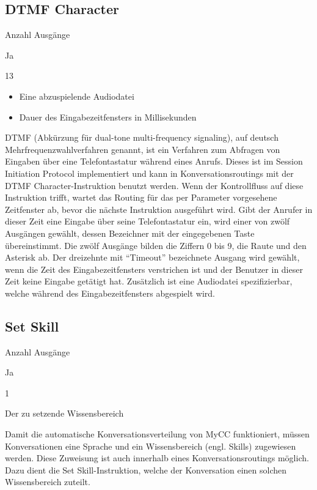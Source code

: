 \subsection{DTMF Character}
\label{subsec:DTMF Character}
\begin{labeling}{Anzahl Ausgänge}
\item [Eingang] Ja
\item [Anzahl Ausgänge] 13
\item [Parameter] \begin{itemize} \item Eine abzuspielende Audiodatei  \item Dauer des Eingabezeitfensters in Millisekunden \end{itemize}
\item [Beschreibung] DTMF (Abkürzung für dual-tone multi-frequency signaling), auf deutsch Mehr\-fre\-quenz\-wahl\-ver\-fah\-ren genannt, ist ein Verfahren zum Abfragen von Eingaben über eine Telefontastatur während eines Anrufs. Dieses ist im Session Initiation Protocol implementiert und kann in Konversationsroutings mit der DTMF Character-Instruktion benutzt werden. Wenn der Kontrollfluss auf diese Instruktion trifft, wartet das Routing für das per Parameter vorgesehene Zeitfenster ab, bevor die nächste Instruktion ausgeführt wird. Gibt der Anrufer in dieser Zeit eine Eingabe über seine Telefontastatur ein, wird einer von zwölf Ausgängen gewählt, dessen Bezeichner mit der eingegebenen Taste übereinstimmt. Die zwölf Ausgänge bilden die Ziffern 0 bis 9, die Raute und den Asterisk ab. Der dreizehnte mit ``Timeout'' bezeichnete Ausgang wird gewählt, wenn die Zeit des Eingabezeitfensters verstrichen ist und der Benutzer in dieser Zeit keine Eingabe getätigt hat. Zusätzlich ist eine Audiodatei spezifizierbar, welche während des Eingabezeitfensters abgespielt wird.  
\end{labeling}

\subsection{Set Skill}
\label{subsec:Set Skill}
\begin{labeling}{Anzahl Ausgänge}
\item [Eingang] Ja
\item [Anzahl Ausgänge] 1
\item [Parameter] Der zu setzende Wissensbereich
\item [Beschreibung] Damit die automatische Konversationsverteilung von MyCC funktioniert, müssen Konversationen eine Sprache und ein Wissensbereich (engl. Skills) zugewiesen werden. Diese Zuweisung ist auch innerhalb eines Konversationsroutings möglich. Dazu dient die Set Skill-Instruktion, welche der Konversation einen solchen Wissensbereich zuteilt.
\end{labeling}

